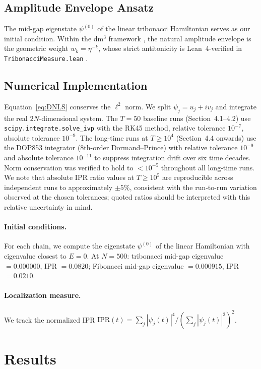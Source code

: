 \documentclass[12pt,a4paper]{article}
\begin{document}
\subsection{Amplitude Envelope Ansatz}

The mid-gap eigenstate $\psi^{(0)}$ of the linear tribonacci Hamiltonian
serves as our initial condition. Within the dm$^3$ framework
\cite{Grossi2026_Vol1}, the natural amplitude envelope is the geometric
weight $w_k = \eta^{-k}$, whose strict antitonicity is Lean~4-verified in
\texttt{TribonacciMeasure.lean} \cite{AXLE2026}.

\subsection{Numerical Implementation}

Equation~\eqref{eq:DNLS} conserves the $\ell^2$ norm. We split
$\psi_j = u_j + iv_j$ and integrate the real $2N$-dimensional system. The
$T=50$ baseline runs (Section~4.1--4.2) use \texttt{scipy.integrate.solve\_ivp}
with the RK45 method, relative tolerance $10^{-7}$, absolute tolerance
$10^{-9}$. The long-time runs at $T \geq 10^4$ (Section~4.4 onwards) use the
DOP853 integrator (8th-order Dormand--Prince) with relative tolerance
$10^{-9}$ and absolute tolerance $10^{-11}$ to suppress integration drift
over six time decades. Norm conservation was verified to hold to
$<10^{-5}$ throughout all long-time runs. We note that absolute IPR ratio
values at $T \geq 10^5$ are reproducible across independent runs to
approximately $\pm 5\%$, consistent with the run-to-run variation observed
at the chosen tolerances; quoted ratios should be interpreted with this
relative uncertainty in mind.

\paragraph{Initial conditions.} For each chain, we compute the eigenstate
$\psi^{(0)}$ of the linear Hamiltonian with eigenvalue closest to $E=0$.
At $N=500$: tribonacci mid-gap eigenvalue $=0.000000$, IPR $=0.0820$;
Fibonacci mid-gap eigenvalue $=0.000915$, IPR $=0.0210$.

\paragraph{Localization measure.} We track the normalized IPR
$\mathrm{IPR}(t) = \sum_j |\psi_j(t)|^4 / (\sum_j |\psi_j(t)|^2)^2$.

\section{Results}
\end{document}
